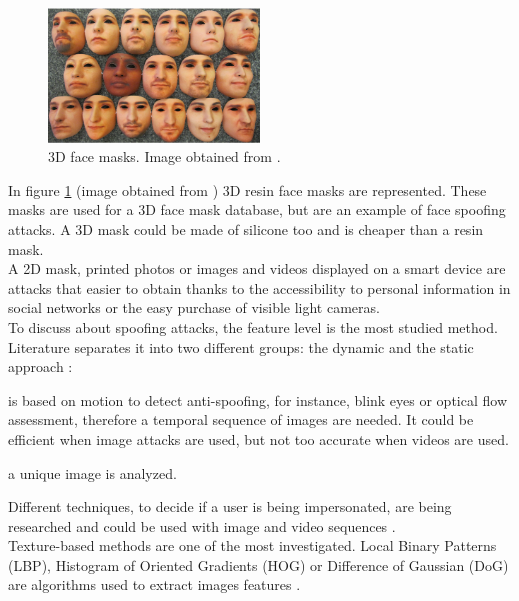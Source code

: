 \begin{figure}[htb]
\centering
\includegraphics[width=0.5\textwidth]{images_miscelaneus/fig_masks.png}
\caption{3D face masks. Image obtained from \cite{3dmask}.} \label{fig:3dMasks}
\end{figure}

In figure \ref{fig:3dMasks} (image obtained from \cite{3dmask}) 3D resin face masks  are represented. These masks are used for a 3D face mask database, but are an example of face spoofing attacks. A 3D mask could be made of silicone too and is cheaper than a resin mask.\\

A 2D mask, printed photos or images and videos displayed on a smart device are attacks that easier to obtain thanks to the accessibility to personal information in social networks or the easy purchase of visible light cameras.\\

 
To discuss about spoofing attacks, the feature level is the most studied method. Literature separates it into two different groups: the dynamic and the static approach \cite{Spoofing_survey}:
\begin{description}[itemsep=2pt,topsep=8pt,parsep=0pt,partopsep=20pt]
\item[Dynamic:] is based on motion to detect anti-spoofing, for instance, blink eyes or optical flow assessment, therefore a temporal sequence of images are needed. It could be efficient when image attacks are used, but not too accurate when videos are used.
\item[Static:] a unique image is analyzed.
\end{description}

Different techniques, to decide if a user is being impersonated, are being researched and could be used with image and video sequences \cite{Spoofing_survey}.\\

Texture-based methods are one of the most investigated. Local Binary Patterns (LBP),  Histogram of Oriented Gradients (HOG) or Difference of Gaussian (DoG) are algorithms used to extract images features \cite{distorsion,Spoofing_survey}.\\

